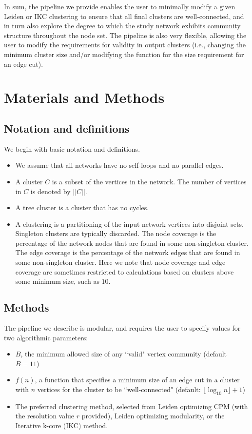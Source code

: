 \documentclass[11pt]{article}   	%
\begin{document}
In sum, the pipeline we provide enables 
the user to minimally modify a given Leiden or IKC clustering to ensure that all final clusters are well-connected, and in turn also explore the degree to which the study network exhibits 
community structure throughout the node set. The pipeline is also very flexible, allowing the user to modify the requirements for validity in output clusters (i.e., changing the minimum cluster 
size and/or modifying the function for the size requirement for an edge cut).

\section{Materials and Methods}

\subsection{Notation and definitions}
We begin with basic notation and definitions.
\begin{itemize}
\item We assume that all networks have no self-loops and no parallel edges.
\item A cluster $C$ is a subset of the vertices in the network. The number of vertices in $C$ is denoted by $||C||$.
\item A tree cluster is a cluster that has no cycles.
\item A clustering is a partitioning of the input network vertices into disjoint sets.  Singleton clusters are typically
discarded.  The node coverage is the percentage of the network nodes that are found in some non-singleton cluster.
The edge coverage is the percentage of the network edges that are found in some non-singleton cluster.
Here we note that node coverage and edge coverage are sometimes restricted to calculations based on clusters above some minimum size, such as $10$.
\end{itemize}

\subsection{Methods}
The pipeline we describe is modular, and requires the user to specify values for two algorithmic parameters:
\begin{itemize}
\item $B$, the minimum allowed size of any ``valid" vertex community (default $B=11$)
\item $f(n)$, a function that specifies a minimum size of an edge cut in a cluster with $n$ vertices  for the cluster to be ``well-connected" (default: $ \lfloor \log_{10} n \rfloor +1$)
\item The preferred clustering method, selected from Leiden optimizing CPM (with the resolution value $r$ provided), Leiden optimizing modularity, or the Iterative k-core (IKC) method.
\end{itemize}
\end{document}
